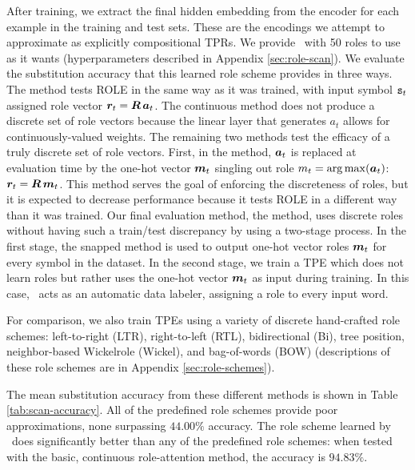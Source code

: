 After training, we extract the final hidden embedding from the encoder for each example in the training and test sets. These are the encodings we attempt to approximate as explicitly compositional TPRs. 
We provide \RLN\ with 50 roles to use as it wants (hyperparameters described in Appendix \ref{sec:role-scan}).
We evaluate the substitution accuracy that this learned role scheme provides in three ways. The  method tests ROLE in the same way as it was trained, with input symbol ${\mathtt{s}}_t$ assigned role vector ${\bm{r}}_t = {\bm{R}}\, {\bm{a}}_t$. The continuous method does not produce a discrete set of role vectors because the linear layer that generates $a_t$ allows for continuously-valued weights. The remaining two methods test the efficacy of a truly discrete set of role vectors. First, in the  method, ${\bm{a}}_t$ is replaced at evaluation time by the one-hot vector ${\bm{m}}_t$ singling out role $m_t = \operatorname*{arg\,max}({\bm{a}}_t)$: ${\bm{r}}_t = {\bm{R}}\, {\bm{m}}_t$. This method serves the goal of enforcing the discreteness of roles, but it is expected to decrease performance because it tests ROLE in a different way than it was trained. Our final evaluation method, the  method, uses discrete roles without having such a train/test discrepancy by using a two-stage process. In the first stage, the snapped method is used to output one-hot vector roles ${\bm{m}}_t$ for every symbol in the dataset. In the second stage, we train a TPE which does not learn roles but rather uses the one-hot vector ${\bm{m}}_t$ as input during training. In this case, \RLN\ acts as an automatic data labeler, assigning a role to every input word.

For comparison, we also train TPEs using a variety of discrete hand-crafted role schemes: left-to-right (LTR), right-to-left (RTL), bidirectional (Bi), tree position, neighbor-based Wickelrole (Wickel), and bag-of-words (BOW) (descriptions of these role schemes are in Appendix \ref{sec:role-schemes}). 

The mean substitution accuracy from these different methods is shown in Table \ref{tab:scan-accuracy}. 
All of the predefined role schemes provide poor approximations, none surpassing $44.00\%$ accuracy. 
The role scheme learned by \RLN\ does significantly better than any of the predefined role schemes: when tested with the basic, continuous role-attention method, the accuracy is $94.83\%$. 

